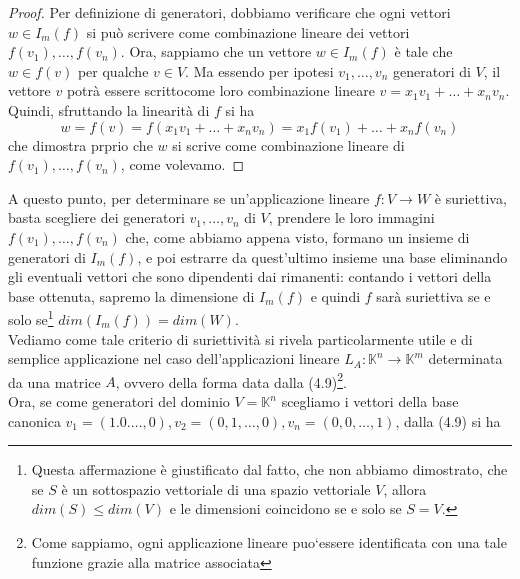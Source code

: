 \begin{proof}
  Per definizione di generatori, dobbiamo verificare che ogni vettori $w\in I_m(f)$ si può scrivere come
  combinazione lineare dei vettori $f(v_1),\dots,f(v_n)$. Ora, sappiamo che un vettore $w\in I_m(f)$ è tale che
  $w\in f(v)$ per qualche $v\in V$. Ma essendo per ipotesi $v_1,\dots,v_n$ generatori di $V$, il vettore
  $v$ potrà essere scrittocome loro combinazione lineare $v=x_1v_1+\dots+x_nv_n$. Quindi, sfruttando la
  linearità di $f$ si ha
  \begin{equation*}
    w=f(v)=f(x_1v_1+\dots+x_nv_n)=x_1f(v_1)+\dots+x_nf(v_n)
  \end{equation*}
  che dimostra prprio che $w$ si scrive come combinazione lineare di $f(v_1),\dots,f(v_n)$, come volevamo.
\end{proof}
A questo punto, per determinare se un'applicazione lineare $f:V\to W$ è suriettiva, basta scegliere dei
generatori $v_1,\dots,v_n$ di $V$, prendere le loro immagini $f(v_1),\dots,f(v_n)$ che, come abbiamo appena
visto, formano un insieme di generatori di $I_m(f)$, e poi estrarre da quest'ultimo insieme una base eliminando
gli eventuali vettori che sono dipendenti dai rimanenti: contando i vettori della base ottenuta, sapremo la
dimensione di $I_m(f)$ e quindi $f$ sarà suriettiva se e solo se\footnote{Questa affermazione è giustificato
  dal fatto, che non abbiamo dimostrato, che se $S$ è un sottospazio vettoriale di una spazio vettoriale $V$,
  allora $dim (S)\leq dim (V)$ e le dimensioni coincidono se e solo se $S=V$.} $dim(I_m(f))=dim(W)$.\\
Vediamo come tale criterio di suriettività si rivela particolarmente utile e di semplice applicazione nel caso
dell'applicazioni lineare $L_A:\mathds{K}^n\to \mathds{K}^m$ determinata da una matrice $A$, ovvero della forma
data dalla (4.9)\footnote{Come sappiamo, ogni applicazione lineare puo`essere identificata con una tale
  funzione grazie alla matrice associata}.\\
Ora, se come generatori del dominio $V=\mathds{K}^n$ scegliamo i vettori della base canonica
$v_1=(1.0.\dots,0),v_2=(0,1,\dots,0),v_n=(0,0,\dots,1)$, dalla (4.9) si ha

